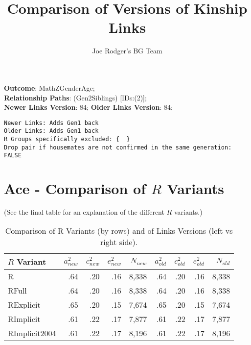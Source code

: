 \documentclass{article}\usepackage[]{graphicx}\usepackage[]{color}
\title{Comparison of Versions of Kinship Links}
\author{Joe Rodger's BG Team}
\makeatletter
\newenvironment{kframe}{%
 \def\at@end@of@kframe{}%
 \ifinner\ifhmode%
  \def\at@end@of@kframe{\end{minipage}}%
  \begin{minipage}{\columnwidth}%
 \fi\fi%
 \def\FrameCommand##1{\hskip\@totalleftmargin \hskip-\fboxsep
 \colorbox{shadecolor}{##1}\hskip-\fboxsep
     \hskip-\linewidth \hskip-\@totalleftmargin \hskip\columnwidth}%
 \MakeFramed {\advance\hsize-\width
   \@totalleftmargin\z@ \linewidth\hsize
   \@setminipage}}%
 {\par\unskip\endMakeFramed%
 \at@end@of@kframe}
\newenvironment{knitrout}{}{} %
\makeatother
\begin{document}
\maketitle
\setcounter{totalnumber}{8} %

\setlength{\parindent}{0pt}%











\textbf{Outcome}: MathZGenderAge;\\
\textbf{Relationship Paths}: (Gen2Siblings) [IDs:(2)];\\
\textbf{Newer Links Version}: 84;
\textbf{Older Links Version}: 84;

\begin{knitrout}
\color{fgcolor}\begin{kframe}
\begin{verbatim}
Newer Links: Adds Gen1 back
Older Links: Adds Gen1 back
R Groups specifically excluded: {  }
Drop pair if housemates are not confirmed in the same generation: FALSE
\end{verbatim}
\end{kframe}
\end{knitrout}





\section{Ace - Comparison of $R$ Variants} 
(See the final table for an explanation of the different $R$ variants.)
\begin{table}[ht]
\centering
{\large
\begin{tabular}{l|rrrr|rrrr}
  \hline
$R$ Variant & $a_{new}^2$ & $c_{new}^2$ & $e_{new}^2$ & $N_{new}$ & $a_{old}^2$ & $c_{old}^2$ & $e_{old}^2$ & $N_{old}$ \\ 
  \hline
R & .64 & .20 & .16 & 8,338 & .64 & .20 & .16 & 8,338 \\ 
  RFull & .64 & .20 & .16 & 8,338 & .64 & .20 & .16 & 8,338 \\ 
  RExplicit & .65 & .20 & .15 & 7,674 & .65 & .20 & .15 & 7,674 \\ 
  RImplicit & .61 & .22 & .17 & 7,877 & .61 & .22 & .17 & 7,877 \\ 
  RImplicit2004 & .61 & .22 & .17 & 8,196 & .61 & .22 & .17 & 8,196 \\ 
   \hline
\end{tabular}
}
\caption{Comparison of R Variants (by rows) and of Links Versions (left vs right side).} 
\end{table}
\end{document}
